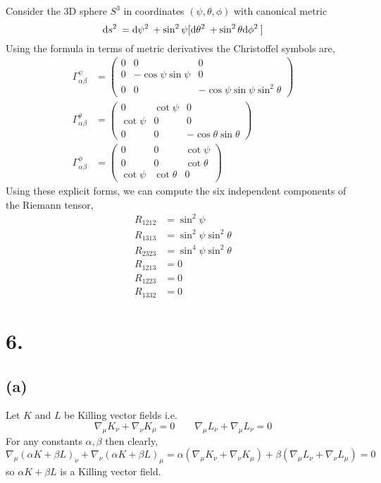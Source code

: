 \documentclass[12pt]{article}
\begin{document}
Consider the 3D sphere $S^3$ in coordinates $(\psi, \theta, \phi)$ with canonical metric
\[ \mathrm{d}s^2 \: = \mathrm{d}\psi^2 \: + \sin^2{\psi} [ \mathrm{d}\theta^2 \: + \sin^2{\theta} \mathrm{d}\phi^2 \: ] \]
Using the formula in terms of metric derivatives the Christoffel symbols are,
\begin{align*}
\Gamma^\psi_{\alpha \beta} & = 
\begin{pmatrix}
0 & 0 & 0
\\
0 & - \cos{\psi} \sin{\psi} & 0 
\\
0 & 0 & - \cos{\psi} \sin{\psi} \sin^2 {\theta} 
\end{pmatrix}
\\
\Gamma^\theta_{\alpha \beta} & = 
\begin{pmatrix}
0 & \cot{\psi} & 0
\\
\cot{\psi} & 0 & 0 
\\
0 & 0 & - \cos{\theta} \sin{\theta} 
\end{pmatrix}
\\
\Gamma^{\phi}_{\alpha \beta} & =  
\begin{pmatrix}
0 & 0 & \cot{\psi}
\\
0 & 0 & \cot{\theta}
\\
\cot{\psi} & \cot{\theta} & 0
\end{pmatrix} 
\end{align*}
Using these explicit forms, we can compute the six independent components of the Riemann tensor,
\begin{align*}
R_{1212} & = \sin^2{\psi}
\\
R_{1313} & = \sin^2{\psi} \sin^2{\theta}
\\
R_{2323} & = \sin^4{\psi} \sin^2{\theta}
\\
R_{1213} & = 0
\\
R_{1223} & = 0
\\
R_{1332} & = 0
\end{align*}
\section*{6.}

\subsection*{(a)}

Let $K$ and $L$ be Killing vector fields i.e.
\[ \nabla_\mu K_\nu + \nabla_\nu K_\mu = 0 \quad \quad \nabla_\mu L_\nu + \nabla_\mu L_\nu = 0 \]
For any constants $\alpha, \beta$ then clearly,
\[ \nabla_\mu (\alpha K + \beta L)_\nu + \nabla_\nu (\alpha K + \beta L)_\mu = \alpha (\nabla_\mu K_\nu + \nabla_\nu K_\mu) + \beta (\nabla_\mu L_\nu + \nabla_\nu L_\mu) = 0 \]
so $\alpha K + \beta L$ is a Killing vector field. 
\end{document}
